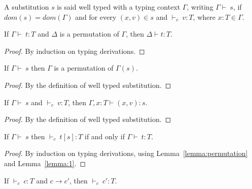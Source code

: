 \documentclass {article}
\newcommand{\tto}{\longrightarrow}
\newcommand{\SubxD}{(x,v):s}
\newcommand{\env}{{\Gamma \vdash \ }}
\newcommand{\tyC}{{\vdash_c \ }}
\begin{document}
\begin{definition}
\label{definition:wts}
\mbox{}
A substitution $s$ is said well typed with a typing context $\Gamma$, writing $\env s$, if $dom(s) = dom(\Gamma)$ and for every $(x,v) \in s$ and $\tyC v:T$, where $x:T \in \Gamma$.
\end{definition}

\begin{lemma}[Permutation]
\label{lemma:permutation}
\mbox{}
If $\env t : T$ and $\Delta$ is a permutation of $\Gamma$, then $\Delta \vdash t : T$.
\end{lemma}

\begin{proof}By induction on typing derivations.
\end{proof}

\begin{lemma}
\label{lemma:1}
\mbox{}
If $\env s$ then $\Gamma$ is a permutation of $\Gamma(s)$.
\end{lemma}

\begin{proof}By the definition of well typed substitution.
\end{proof}
\begin{lemma}
\label{lemma:2}
\mbox{}
If $\env s$ and $\tyC v : T$, then $\Gamma,x:T \vdash \SubxD$.
\end{lemma}

\begin{proof} By the definition of well typed substitution.\end{proof}

\begin{lemma}
\label{lemma:3}
\mbox{}
If $\env s$ then $\tyC t[s] : T$ if and only if $\env t:T$.
\end{lemma}

\begin{proof}By induction on typing derivations, using Lemma~\ref{lemma:permutation} and Lemma~\ref{lemma:1}.
\end{proof}


\begin{theorem}[Preservation]
\label{theorem:preservation}
\mbox{}
If $\tyC c : T$ and $c \tto c'$, then $\tyC c	' : T$.
\end{theorem}
\end{document}
